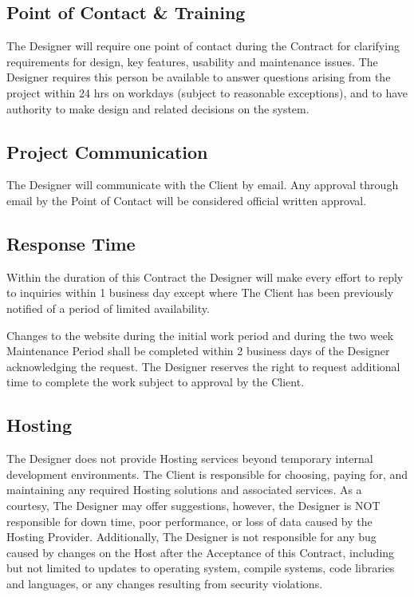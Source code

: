 \documentclass[a4paper,12pt]{article} %
\begin{document}

\subsection{Point of Contact \& Training}

The Designer will require one point of contact during the Contract for clarifying requirements for design, key features, usability and maintenance issues. The Designer requires this person be available to answer questions arising from the project within 24 hrs on workdays (subject to reasonable exceptions), and to have authority to make design and related decisions on the system.


\subsection{Project Communication}

The Designer will communicate with the Client by email. Any approval through email by the Point of Contact will be considered official written approval.


\subsection{Response Time}

Within the duration of this Contract the Designer will make every effort to reply to inquiries within 1 business day except where The Client has been previously notified of a period of limited availability.

Changes to the website during the initial work period and during the two week Maintenance Period shall be completed within 2 business days of the Designer acknowledging the request. The Designer reserves the right to request additional time to complete the work subject to approval by the Client.


\subsection{Hosting}

The Designer does not provide Hosting services beyond temporary internal development environments. The Client is responsible for choosing, paying for, and maintaining any required Hosting solutions and associated services. As a courtesy, The Designer may offer suggestions, however, the Designer is NOT responsible for down time, poor performance, or loss of data caused by the Hosting Provider. Additionally, The Designer is not responsible for any bug caused by changes on the Host after the Acceptance of this Contract, including but not limited to updates to operating system, compile systems, code libraries and languages, or any changes resulting from security violations.
\end{document}
